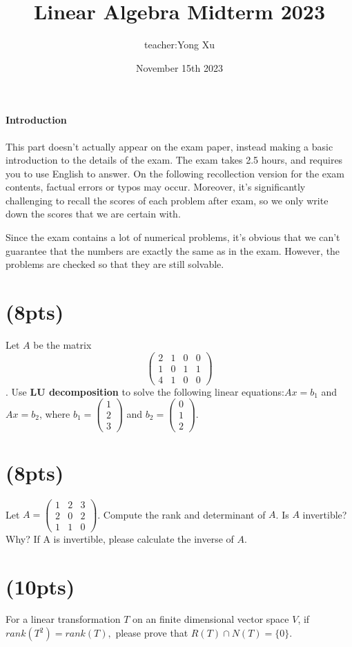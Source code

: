 \documentclass{article}
\title{Linear Algebra Midterm 2023}
\author{teacher:Yong Xu}
\date{November 15th 2023}
\begin{document}
\maketitle
\paragraph{Introduction}
This part doesn't actually appear on the exam paper, instead making a basic introduction to the details of the exam. The exam takes 2.5 hours, and requires you to use English to answer. On the following recollection version for the exam contents, factual errors or typos may occur. Moreover, it's significantly challenging to recall the scores of each problem after exam, so we only write down the scores that we are certain with.

Since the exam contains a lot of numerical problems, it's obvious that we can't guarantee that the numbers are exactly the same as in the exam. However, the problems are checked so that they are still solvable.

\section{(8pts)}
Let $A$ be the matrix $$\begin{pmatrix} 2 & 1 & 0 & 0\\ 1 & 0 & 1 & 1 \\ 4 & 1 & 0 & 0 \end{pmatrix}$$ . Use \textbf{LU decomposition} to solve the following linear equations:$Ax=b_1$ and $Ax=b_2$, where $b_1=\begin{pmatrix}1\\2\\3\end{pmatrix}$ and $b_2=\begin{pmatrix}0\\1\\2\end{pmatrix}$.

\section{(8pts)}
Let $A=\begin{pmatrix}
    1&2&3\\2&0&2\\1&1&0
\end{pmatrix}$. Compute the rank and determinant of $A$. Is $A$ invertible? Why? If A is invertible, please calculate the inverse of $A$.
\section{(10pts)}
For a linear transformation $T$ on an finite dimensional vector space $V$, if $rank(T^2)=rank(T),$  please prove that $R(T)\cap N(T)=\{0\}.$
\end{document}
